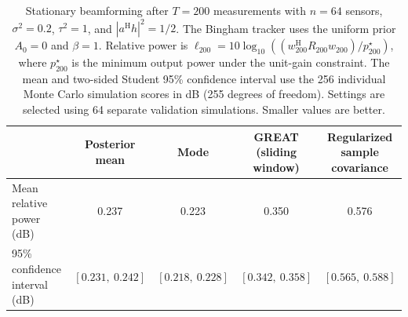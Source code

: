 \begin{table}[t]
\centering
\small
\caption{Stationary beamforming after $T=200$ measurements with $n=64$ sensors, $\sigma^2=0.2$, $\tau^2=1$, and $|a^{\mathrm H}h|^2=1/2$. The Bingham tracker uses the uniform prior $A_0=0$ and $\beta=1$. Relative power is $\ell_{200}=10\log_{10}((w_{200}^{\mathrm H}R_{200}w_{200})/p_{200}^{\star})$, where $p_{200}^{\star}$ is the minimum output power under the unit-gain constraint. The mean and two-sided Student 95\% confidence interval use the 256 individual Monte Carlo simulation scores in dB (255 degrees of freedom). Settings are selected using 64 separate validation simulations. Smaller values are better.}
\label{tab:beamforming-stationary-T200}
\begin{tabular}{@{}lcccc@{}}
\toprule
 & \shortstack{Posterior\\mean} & Mode & \shortstack{GREAT\\(sliding window)} & \shortstack{Regularized sample\\covariance} \\
\midrule
Mean relative power (dB) & 0.237 & 0.223 & 0.350 & 0.576 \\
95\% confidence interval (dB) & $[0.231,\ 0.242]$ & $[0.218,\ 0.228]$ & $[0.342,\ 0.358]$ & $[0.565,\ 0.588]$ \\
\bottomrule
\end{tabular}
\end{table}

